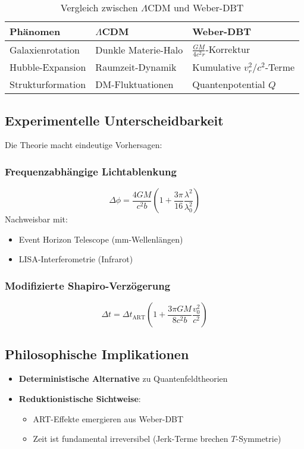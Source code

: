 \begin{table}[ht]
\centering
\caption{Vergleich zwischen $\Lambda$CDM und Weber-DBT}
\label{tab:comparison}
\begin{tabular}{lll}
\toprule
\textbf{Phänomen} & \textbf{$\Lambda$CDM} & \textbf{Weber-DBT} \\
\midrule
Galaxienrotation & Dunkle Materie-Halo & $\frac{GM}{4c^2r}$-Korrektur \\
Hubble-Expansion & Raumzeit-Dynamik & Kumulative $v_r^2/c^2$-Terme \\
Strukturformation & DM-Fluktuationen & Quantenpotential $Q$ \\
\bottomrule
\end{tabular}
\end{table}

\subsection{Experimentelle Unterscheidbarkeit}
Die Theorie macht eindeutige Vorhersagen:

\subsubsection{Frequenzabhängige Lichtablenkung}
\begin{equation}
\Delta\phi = \frac{4GM}{c^2b}\left(1 + \frac{3\pi}{16}\frac{\lambda^2}{\lambda_0^2}\right)
\end{equation}
Nachweisbar mit:
\begin{itemize}
\item Event Horizon Telescope (mm-Wellenlängen)
\item LISA-Interferometrie (Infrarot)
\end{itemize}

\subsubsection{Modifizierte Shapiro-Verzögerung}
\begin{equation}
\Delta t = \Delta t_{\mathrm{ART}} \left(1 + \frac{3\pi GM}{8c^2b}\frac{v_0^2}{c^2}\right)
\end{equation}

\subsection{Philosophische Implikationen}
\begin{itemize}
\item \textbf{Deterministische Alternative} zu Quantenfeldtheorien
\item \textbf{Reduktionistische Sichtweise}:
\begin{itemize}
\item ART-Effekte emergieren aus Weber-DBT
\item Zeit ist fundamental irreversibel (Jerk-Terme brechen $T$-Symmetrie)
\end{itemize}
\end{itemize}

